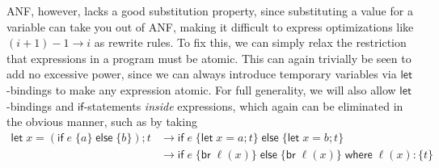 \documentclass[acmsmall,screen,review]{acmart}
\newcommand{\ms}[1]{\ensuremath{\mathsf{#1}}}
\begin{document}
ANF, however, lacks a good substitution property, since substituting a value for a variable can take
you out of ANF, making it difficult to express optimizations like $(i + 1) - 1 \to i$ as rewrite
rules. To fix this, we can simply relax the restriction that expressions in a program must be
atomic. This can again trivially be seen to add no excessive power, since we can always introduce
temporary variables via \ms{let}-bindings to make any expression atomic. For full generality, we
will also allow \ms{let}-bindings and \ms{if}-statements \textit{inside} expressions, which again
can be eliminated in the obvious manner, such as by taking
\begin{align*}
  \ms{let}\;x = (\ms{if}\;e\;\{a\}\;\ms{else}\;\{b\}); t &
    \to \ms{if}\;e\;\{\ms{let}\;x = a; t\}\;\ms{else}\;\{\ms{let}\;x = b; t\} \\ 
  & \to \ms{if}\;e\;\{\ms{br}\;\ell(x)\}\;\ms{else}\;\{\ms{br}\;\ell(x)\}\;
        \ms{where}\;\ell(x): \{t\}
\end{align*}
\end{document}

